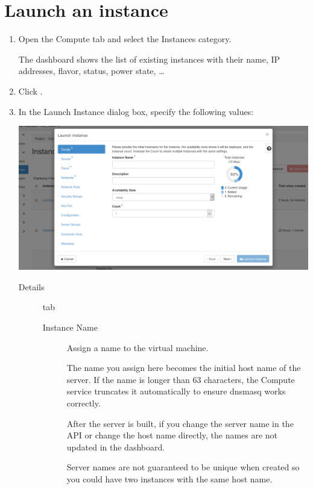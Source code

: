 \section{Launch an instance}\label{launch-an-instance}
\begin{enumerate}
\item Open the Compute tab and select the Instances category.

  The dashboard shows the list of existing instances with their name,
  IP addresses, flavor, status, power state, \ldots
\item Click .
\item In the Launch Instance dialog box, specify the following values:

  \begin{center}
    \includegraphics[scale=0.5]{img/tab-compute-instances-launch.png}
  \end{center}
  
  \begin{description}
  \item[Details] tab
    \begin{description}
    \item[Instance Name] Assign a name to the virtual machine.

       The name you assign here becomes the initial host
      name of the server. If the name is longer than 63 characters,
      the Compute service truncates it automatically to ensure dnsmasq
      works correctly.

      After the server is built, if you change the server name in the
      API or change the host name directly, the names are not updated
      in the dashboard.

      Server names are not guaranteed to be unique when created so you
      could have two instances with the same host name.


\end{description}
\end{description}
\end{enumerate}
